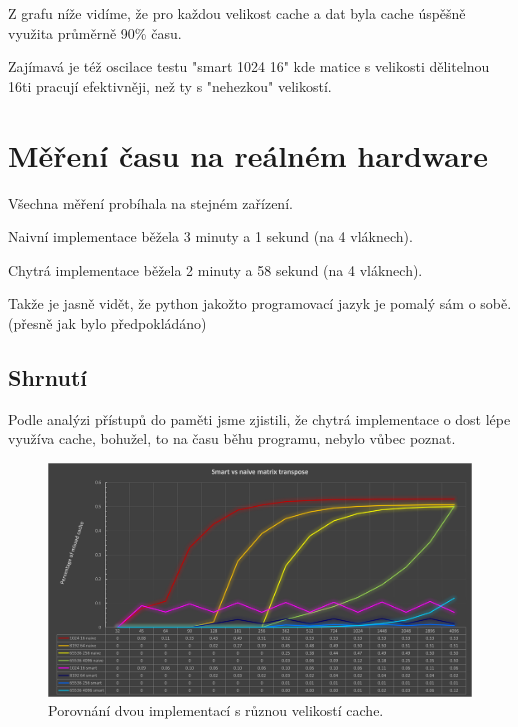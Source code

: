 \documentclass[a4paper]{article}
\begin{document}
	Z grafu níže vidíme, že pro každou velikost cache a dat byla cache úspěšně využita
	průměrně 90\% času. 

	Zajímavá je též oscilace testu "smart 1024 16" kde matice s velikosti dělitelnou
	16ti pracují efektivněji, než ty s "nehezkou" velikostí.

	\section{Měření času na reálném hardware}

  	Všechna měření probíhala na stejném zařízení.

	Naivní implementace běžela 3 minuty a 1 sekund (na 4 vláknech). 

	Chytrá implementace běžela 2 minuty a 58 sekund (na 4 vláknech). 

	Takže je jasně vidět, že python jakožto programovací jazyk je pomalý sám o sobě.
	(přesně jak bylo předpokládáno)
	
	\subsection{Shrnutí}

	Podle analýzi přístupů do paměti jsme zjistili, že chytrá implementace o dost
	lépe využíva cache, bohužel, to na času běhu programu, nebylo vůbec poznat.

    \begin{figure}[H]
		\centering
		\includegraphics[angle=90,width=\textwidth,height=\textheight,keepaspectratio]{img/graph1.png}
		\caption{Porovnání dvou implementací s různou velikostí cache.}
		\label{fig:1_graph}
	\end{figure}
\end{document}
